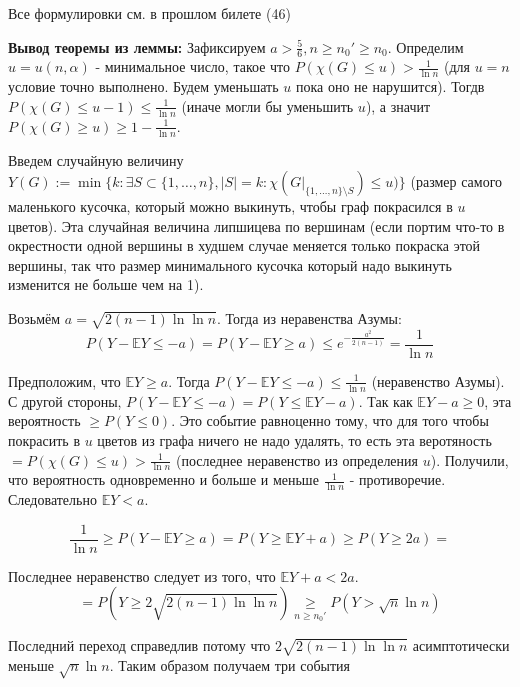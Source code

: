 \par Все формулировки см. в прошлом билете (46)

\par \textbf{Вывод теоремы из леммы:} \Proof Зафиксируем $a > \frac{5}{6}, n \geq n_0' \geq n_0$. Определим $u=u(n, \alpha)$ - минимальное число, такое что $P(\chi(G) \leq u) > \frac{1}{\ln{n}}$ (для $u=n$ условие точно выполнено. Будем уменьшать $u$ пока оно не нарушится). Тогдв $P(\chi(G) \leq u-1) \leq \frac{1}{\ln{n}}$ (иначе могли бы уменьшить $u$), а значит $P(\chi(G) \geq u) \geq 1-\frac{1}{\ln{n}}$.

\par Введем случайную величину $Y(G):=\min \{k: \exists S \subset \{1, \ldots, n\}, |S|=k: \chi(G|_{\{1, \ldots, n\} \setminus S}) \leq u)\}$ (размер самого маленького кусочка, который можно выкинуть, чтобы граф покрасился в $u$ цветов). Эта случайная величина липшицева по вершинам (если портим что-то в окрестности одной вершины в худшем случае меняется только покраска этой вершины, так что размер минимального кусочка который надо выкинуть изменится не больше чем на 1).

\par Возьмём $a=\sqrt{2(n-1)\ln{\ln{n}}}$. Тогда из неравенства Азумы: $$P(Y-\mathbb{E}Y \leq -a)=P(Y-\mathbb{E}Y \geq a)\leq e^{-\frac{a^2}{2(n-1)}}=\frac{1}{\ln{n}}$$

\par Предположим, что $\mathbb{E}Y\geq a$. Тогда $P(Y-\mathbb{E}Y \leq -a) \leq \frac{1}{\ln{n}}$ (неравенство Азумы). С другой стороны, $P(Y-\mathbb{E}Y \leq -a) = P(Y \leq \mathbb{E}Y-a)$. Так как $\mathbb{E}Y-a \geq 0$, эта вероятность $\geq P(Y \leq 0)$. Это событие равноценно тому, что для того чтобы покрасить в $u$ цветов из графа ничего не надо удалять, то есть эта веротяность $=P(\chi(G) \leq u)>\frac{1}{\ln{n}}$ (последнее неравенство из определения $u$). Получили, что вероятность одновременно и больше и меньше $\frac{1}{\ln{n}}$ - противоречие. Следовательно $\mathbb{E}Y < a$.

$$\frac{1}{\ln{n}} \geq P(Y-\mathbb{E}Y \geq a)=P(Y \geq \mathbb{E}Y + a) \geq P(Y \geq 2a)=$$ 

\par Последнее неравенство следует из того, что $\mathbb{E}Y+a < 2a$.
$$=P(Y \geq 2\sqrt{2(n-1)\ln{\ln{n}}})\underset{n \geq n_0'}{\geq} P(Y > \sqrt{n} \ln{n})$$

\par Последний переход справедлив потому что $2\sqrt{2(n-1)\ln{\ln{n}}}$ асимптотически меньше $\sqrt{n} \ln{n}$. Таким образом получаем три события

